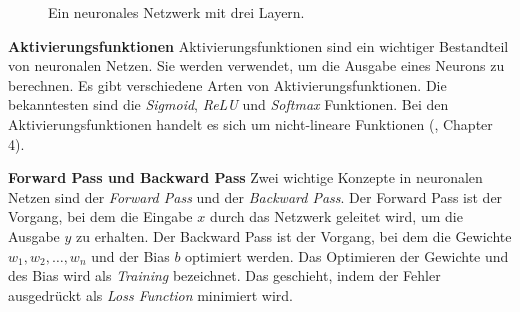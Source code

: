 \documentclass[11pt,a4paper]{article}
\begin{document}
\begin{figure}[h!]
	\centering
	\caption{Ein neuronales Netzwerk mit drei Layern.}
	\label{fig:neural_network}
\end{figure}


\noindent \newline \textbf{Aktivierungsfunktionen} \newline
Aktivierungsfunktionen sind ein wichtiger Bestandteil von neuronalen Netzen. Sie werden verwendet,
um die Ausgabe eines Neurons zu berechnen. Es gibt verschiedene Arten von Aktivierungsfunktionen.
Die bekanntesten sind die \textit{Sigmoid}, \textit{ReLU} und \textit{Softmax} Funktionen. Bei den 
Aktivierungsfunktionen handelt es sich um nicht-lineare Funktionen (\cite{weidman2019deep}, 
Chapter 4).


\noindent \newline \textbf{Forward Pass und Backward Pass} \newline
Zwei wichtige Konzepte in neuronalen Netzen sind der \textit{Forward Pass} und der
\textit{Backward Pass}. Der Forward Pass ist der Vorgang, bei dem die Eingabe \(x\) durch das
Netzwerk geleitet wird, um die Ausgabe \(y\) zu erhalten. Der Backward Pass ist der Vorgang, bei
dem die Gewichte \(w_{1}, w_{2}, \dots, w_{n}\) und der Bias \(b\) optimiert werden. Das Optimieren
der Gewichte und des Bias wird als \textit{Training} bezeichnet. Das geschieht, indem der Fehler 
ausgedrückt als \textit{Loss Function} minimiert wird.
\end{document}

